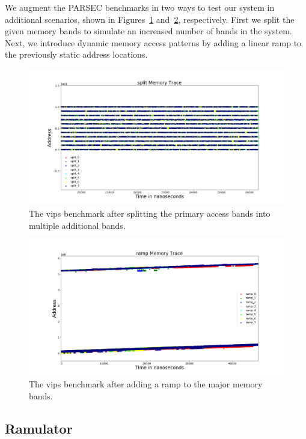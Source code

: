 We augment the PARSEC benchmarks in two ways to test our system in additional scenarios, shown in Figures~\ref{fig:vips_split} and~\ref{fig:vips_ramp}, respectively. First we split the given memory bands to simulate an increased number of bands in the system. Next, we introduce dynamic memory access patterns by adding a linear ramp to the previously static address locations. 

\begin{figure}[htbp]
		\includegraphics[width=\linewidth]{fig/vips_split.png}
		\caption{The vips benchmark after splitting the primary access bands into multiple additional bands.}
		\label{fig:vips_split}
\end{figure}


\begin{figure}[htbp]
		\includegraphics[width=\linewidth]{fig/vips_ramp.png}
		\caption{The vips benchmark after adding a ramp to the major memory bands.}
		\label{fig:vips_ramp}
\end{figure}


\subsection{Ramulator}

